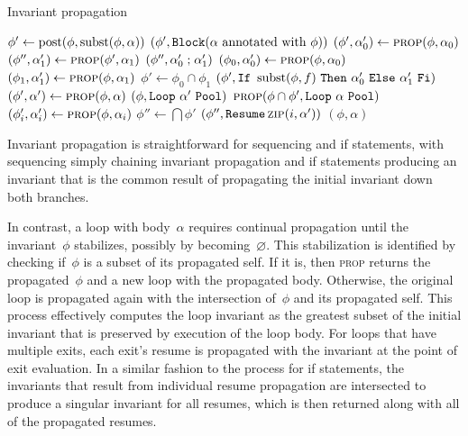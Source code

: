 \begin{algorithm}
  \caption{Invariant propagation}\label{algo:prop}
  \begin{algorithmic}
      \State $\phi'\gets\operatorname{post}(\phi,\operatorname{subst}(\phi,\alpha))$
      \State\Return $(\phi',\operatorname{\mathtt{Block}}(\alpha\text{ annotated with }\phi))$
    \EndFunction
      \State $(\phi',\alpha_0')\gets\Call{prop}{\phi,\alpha_0}$
      \State $(\phi'',\alpha_1')\gets\Call{prop}{\phi',\alpha_1}$
      \State\Return $(\phi'',\alpha_0'\mathrel{\mathtt{;}} \alpha_1')$
    \EndFunction
      \State $(\phi_0,\alpha'_0)\gets\Call{prop}{\phi,\alpha_0}$
      \State $(\phi_1,\alpha'_1)\gets\Call{prop}{\phi,\alpha_1}$
      \State $\phi'\gets\phi_0\cap\phi_1$
      \State\Return $(\phi',\mathtt{If}~\operatorname{subst}(\phi,f)~\mathtt{Then}~
        \alpha'_0~\mathtt{Else}~\alpha'_1~\mathtt{Fi})$
    \EndFunction
      \State $(\phi',\alpha')\gets\Call{prop}{\phi,\alpha}$
        \State\Return $(\phi,\mathtt{Loop}~\alpha'~\mathtt{Pool})$
      \Else
        \State\Return $\Call{prop}{\phi\cap\phi',\AWhile~\alpha~\AOd}$
      \EndIf
    \EndFunction
        \State $(\phi'_i,\alpha'_i)\gets\Call{prop}{\phi,\alpha_i}$
      \EndFor
      \State $\phi''\gets\bigcap\phi'$
      \State\Return $(\phi'',\AWhileResume\Call{zip}{i,\alpha'})$
    \EndFunction
      \State\Return $(\phi,\alpha)$
    \EndFunction
  \end{algorithmic}
\end{algorithm}
Invariant propagation is straightforward for sequencing and if statements,
with sequencing simply chaining invariant propagation
and if statements producing an invariant that is the common result
of propagating the initial invariant down both branches.

In contrast, a loop with body~$\alpha$ requires continual propagation
until the invariant~$\phi$ stabilizes, possibly by becoming~$\varnothing$.
This stabilization is identified
by checking if~$\phi$ is a subset of its propagated self.
If it is, then \textsc{prop} returns the propagated~$\phi$
and a new loop with the propagated body.
Otherwise,
the original loop is propagated again with the intersection of~$\phi$
and its propagated self.
This process effectively computes the loop invariant
as the greatest subset of the initial invariant
that is preserved by execution of the loop body.
For loops that have multiple exits,
each exit's resume is propagated with the invariant at the point of exit evaluation.
In a similar fashion to the process for if statements,
the invariants that result from individual resume propagation
are intersected to produce a singular invariant for all resumes,
which is then returned along with all of the propagated resumes.


